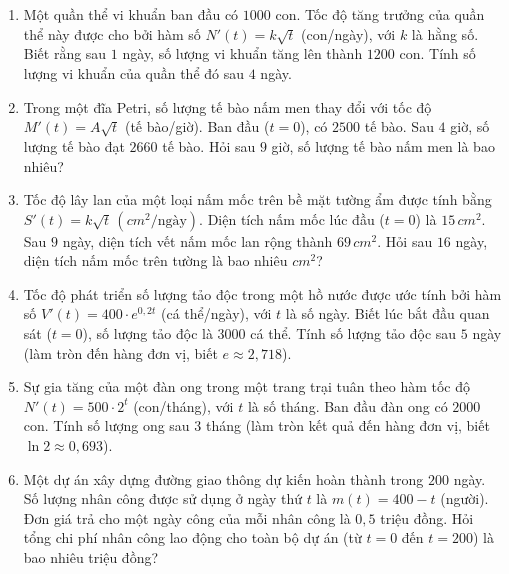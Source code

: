 \documentclass[12pt]{article}
\begin{document}
\begin{enumerate}[label=\textbf{Câu \arabic*.}, start=1]
		\item Một quần thể vi khuẩn ban đầu có $1000$ con. Tốc độ tăng trưởng của quần thể này được cho bởi hàm số $N'(t) = k\sqrt{t}$ (con/ngày), với $k$ là hằng số. Biết rằng sau $1$ ngày, số lượng vi khuẩn tăng lên thành $1200$ con. Tính số lượng vi khuẩn của quần thể đó sau $4$ ngày.
		\vspace{0.75cm}
		
		\item Trong một đĩa Petri, số lượng tế bào nấm men thay đổi với tốc độ $M'(t) = A\sqrt{t}$ (tế bào/giờ). Ban đầu ($t=0$), có $2500$ tế bào. Sau $4$ giờ, số lượng tế bào đạt $2660$ tế bào. Hỏi sau $9$ giờ, số lượng tế bào nấm men là bao nhiêu?
		\vspace{0.75cm}
		
		\item Tốc độ lây lan của một loại nấm mốc trên bề mặt tường ẩm được tính bằng $S'(t) = k\sqrt{t} \, (cm^2/\text{ngày})$. Diện tích nấm mốc lúc đầu ($t=0$) là $15 \, cm^2$. Sau $9$ ngày, diện tích vết nấm mốc lan rộng thành $69 \, cm^2$. Hỏi sau $16$ ngày, diện tích nấm mốc trên tường là bao nhiêu $cm^2$?
		\vspace{0.75cm}
		
		\item Tốc độ phát triển số lượng tảo độc trong một hồ nước được ước tính bởi hàm số $V'(t) = 400 \cdot e^{0,2t}$ (cá thể/ngày), với $t$ là số ngày. Biết lúc bắt đầu quan sát ($t=0$), số lượng tảo độc là $3000$ cá thể. Tính số lượng tảo độc sau $5$ ngày (làm tròn đến hàng đơn vị, biết $e \approx 2,718$).
		\vspace{0.75cm}
		
		\item Sự gia tăng của một đàn ong trong một trang trại tuân theo hàm tốc độ $N'(t) = 500 \cdot 2^t$ (con/tháng), với $t$ là số tháng. Ban đầu đàn ong có $2000$ con. Tính số lượng ong sau $3$ tháng (làm tròn kết quả đến hàng đơn vị, biết $\ln 2 \approx 0,693$).
		\vspace{0.75cm}
		
		\item Một dự án xây dựng đường giao thông dự kiến hoàn thành trong $200$ ngày. Số lượng nhân công được sử dụng ở ngày thứ $t$ là $m(t) = 400 - t$ (người). Đơn giá trả cho một ngày công của mỗi nhân công là $0,5$ triệu đồng. Hỏi tổng chi phí nhân công lao động cho toàn bộ dự án (từ $t=0$ đến $t=200$) là bao nhiêu triệu đồng?
		\vspace{0.75cm}
		

\end{enumerate}
\end{document}
